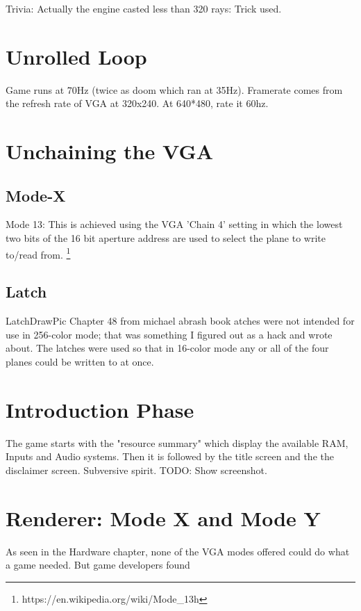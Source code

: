 Trivia: Actually the engine casted less than 320 rays: Trick used.
 

\section{Unrolled Loop}
Game runs at 70Hz (twice as doom which ran at 35Hz). Framerate comes from the refresh rate of VGA at 320x240. At 640*480, rate it 60hz.




\section{Unchaining the VGA}
\subsection{Mode-X}
Mode 13: This is achieved using the VGA 'Chain 4' setting in which the lowest two bits of the 16 bit aperture address are used to select the plane to write to/read from. \footnote{https://en.wikipedia.org/wiki/Mode\_13h}
\subsection{Latch}
LatchDrawPic
Chapter 48 from michael abrash book
atches were not intended for use in 256-color mode; that was something I figured out as a hack and wrote about. The latches were used so that in 16-color mode any or all of the four planes could be written to at once.






\section{Introduction Phase}


The game starts with the "resource summary" which display the available RAM, Inputs and Audio systems. Then it is followed by the title screen and the the disclaimer screen. Subversive spirit.
TODO: Show screenshot.

\section{Renderer: Mode X and Mode Y}
As seen in the Hardware chapter, none of the VGA modes offered could do what a game needed. But game developers found

